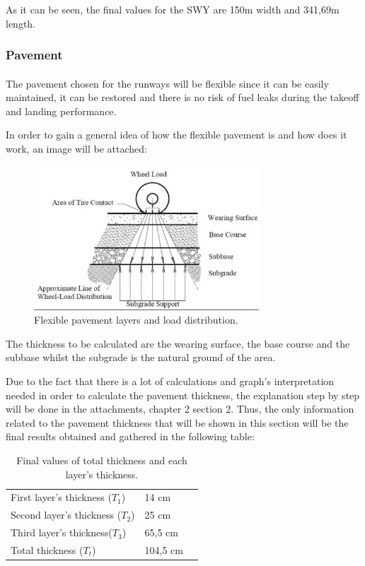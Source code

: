 			As it can be seen, the final values for the SWY are 150m width and 341,69m length.
			
			\subsubsection{Pavement}
			\paragraph{}The pavement chosen for the runways will be flexible since it can be easily maintained, it can be restored and there is no risk of fuel leaks during the takeoff and landing performance.
			
			In order to gain a general idea of how the flexible pavement is and how does it work, an image will be attached:
			
			\begin{figure}[H]
				\centering
				\includegraphics[clip, trim=0cm 0.1cm 0cm 0cm, width=0.75\textwidth]{./images/pavement/flexiblepavement}
				\caption{Flexible pavement layers and load distribution.} %
				\label{} %
			\end{figure}
			
			The thickness to be calculated are the wearing surface, the base course and the subbase whilst the subgrade is the natural ground of the area. 
			
			Due to the fact that there is a lot of calculations and graph's interpretation needed in order to calculate the pavement thickness, the explanation step by step will be done in the attachments, chapter 2 section 2. Thus, the only information related to the pavement thickness that will be shown in this section will be the final results obtained and gathered in the following table:
			
			\begin{table}[htb]
				\centering
				\begin{tabular}{ll p{5cm}}
					\midrule[2pt]
					First layer's thickness (\(T_1\))& 14 cm\\
					Second layer's thickness (\(T_2\)) & 25 cm\\
					Third layer's thickness(\(T_3\))& 65,5 cm \\
					Total thickness (\(T_t\))& 104,5 cm\\
					\bottomrule[2pt]
				\end{tabular}
				\caption{Final values of total thickness and each layer's thickness.}
				\label{}
			\end{table}

